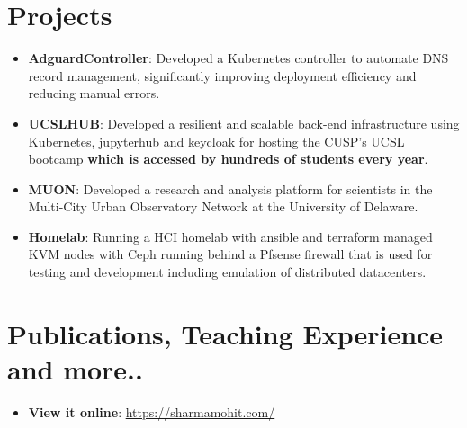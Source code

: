 \documentclass[letterpaper,11pt]{article}
\newcommand{\resumeItem}[2]{
\item\small{
\textbf{#1}{: #2 \vspace{-2pt}}
}
}
\newcommand{\resumeSubItem}[2]{\resumeItem{#1}{#2}\vspace{-4pt}}
\newcommand{\resumeSubHeadingListStart}{\begin{itemize}[leftmargin=*]}
\newcommand{\resumeSubHeadingListEnd}{\end{itemize}}
\begin{document}
\section{\color[HTML]{DF691A} Projects}
\resumeSubHeadingListStart
\resumeSubItem{AdguardController}
{Developed a Kubernetes controller to automate DNS record management, significantly improving deployment efficiency and reducing manual errors.}
\resumeSubItem{UCSLHUB}
{Developed a resilient and scalable back-end infrastructure using Kubernetes, jupyterhub and keycloak for hosting the CUSP's UCSL bootcamp \textbf{which is accessed by hundreds of students every year}.}
\resumeSubItem{MUON}
{Developed a research and analysis platform for scientists in the Multi-City Urban Observatory Network at the University of Delaware.}
\resumeSubItem{Homelab}
{Running a HCI homelab with ansible and terraform managed KVM nodes with Ceph running behind a Pfsense firewall that is used for testing and development including emulation of distributed datacenters.}
\resumeSubHeadingListEnd

\section{\color[HTML]{DF691A} Publications, Teaching Experience and more..}
\resumeSubHeadingListStart
\resumeItem{View it online}{\href{https://sharmamohit.com/work/}{https://sharmamohit.com/}}
\newline
\resumeSubHeadingListEnd
\end{document}
